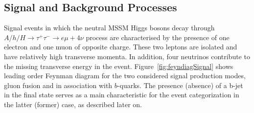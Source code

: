 \subsection{Signal and Background Processes}
Signal events in which the neutral MSSM Higgs bosons decay through 
$A/h/H \rightarrow \tau^+ \tau^- \rightarrow e \mu +4\nu$ process are characterised 
by the presence of one electron and one muon of opposite charge. These two leptons are isolated and have 
relatively high transverse momenta. In addition, four neutrinos contribute to the missing transverse energy in the event. 
Figure~\ref{fig:feyndiagSignal} shows leading order Feynman diagram for the two considered signal production modes,
gluon fusion and in association with $b$-quarks.
The presence (absence) of a b-jet in the final state serves as a main characteristic for the event categorization
in the latter (former) case, as described later on.


